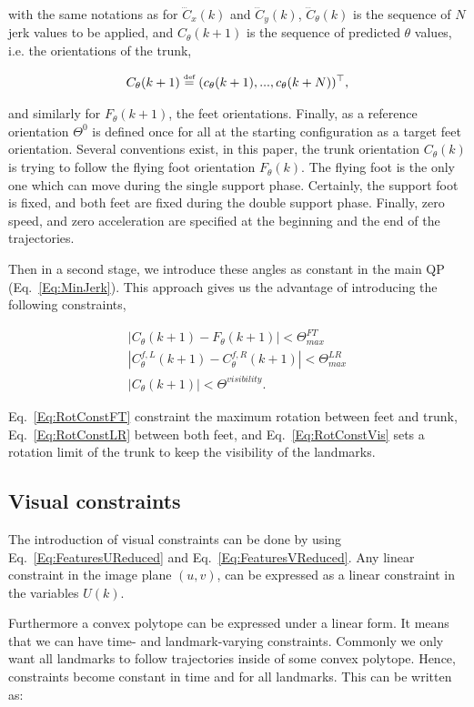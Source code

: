 \noindent with the same notations as for $\dddot{C}_x(k)$ and $\dddot{C}_y(k)$, $\dddot{C}_{\theta}(k)$ is the sequence of $N$ jerk values to be applied, and $C_{\theta}(k+1)$ is the sequence of predicted $\theta$ values, i.e. the orientations of the trunk,  

$$
C_{\theta}(k+1) \stackrel{\mbox{\tiny def}}{=} (c_{\theta}(k+1),...,c_{\theta}(k+N))^{\top},
$$

\noindent and similarly for $F_{\theta}(k+1)$, the feet orientations. Finally, as a reference orientation $\Theta^{0}$ is defined once for all at the starting configuration as a target feet orientation. Several conventions exist, in this paper, the trunk orientation $C_{\theta}(k)$ is trying to follow the flying foot orientation $F_{\theta}(k)$. The flying foot is the only one which can move during the single support phase. Certainly, the support foot is fixed, and both feet are fixed during the double support phase. Finally, zero speed, and zero acceleration are specified at the beginning and the end of the trajectories.

Then in a second stage, we introduce these angles as constant in the main QP (Eq.~\ref{Eq:MinJerk}). This approach gives us the advantage of introducing the following constraints,

\begin{eqnarray}
\label{Eq:RotConstFT}
| C_{\theta}(k+1) - F_{\theta}(k+1)| < \Theta^{FT}_{max} \\
\label{Eq:RotConstLR}
| C_{\theta}^{f,L}(k+1) - C_{\theta}^{f,R}(k+1)| < \Theta^{LR}_{max} \\
\label{Eq:RotConstVis}
| C_{\theta}(k+1)| < \Theta^{visibility}.
\end{eqnarray}

Eq.~\ref{Eq:RotConstFT} constraint the maximum rotation between feet and trunk, Eq.~\ref{Eq:RotConstLR} between both feet, and Eq.~\ref{Eq:RotConstVis} sets a rotation limit of the trunk to keep the visibility of the landmarks.

\subsection{Visual constraints}


The introduction of visual constraints can be done by using Eq.~\ref{Eq:FeaturesUReduced} and Eq.~\ref{Eq:FeaturesVReduced}. Any linear constraint in the image plane $(u,v)$, can be expressed as a linear constraint in the variables $U(k)$.

Furthermore a convex polytope can be expressed under a linear form. It means that we can have time- and landmark-varying constraints. Commonly we only want all landmarks to follow trajectories inside of some convex polytope. Hence, constraints become constant in time and for all landmarks. This can be written as:

